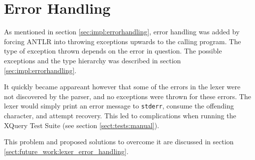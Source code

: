 \section{Error Handling}
\label{sect:error_handling:syntax_errors}
As mentioned in section \ref{sec:impl:errorhandling}, error handling was added
by forcing ANTLR into throwing exceptions upwards to the calling program. The
type of exception thrown depends on the error in question. The possible
exceptions and the type hierarchy was described in section
\ref{sec:impl:errorhandling}.

It quickly became appareant however that some of the errors in the lexer were
not discovered by the parser, and no exceptions were thrown for these errors. The
lexer would simply print an error message to \verb!stderr!, consume the offending
character, and attempt recovery. This led to complications when running the
XQuery Test Suite (see section \ref{sect:tests:manual}).

This problem and proposed solutions to overcome it are discussed in section
\ref{sect:future_work:lexer_error_handling}.



